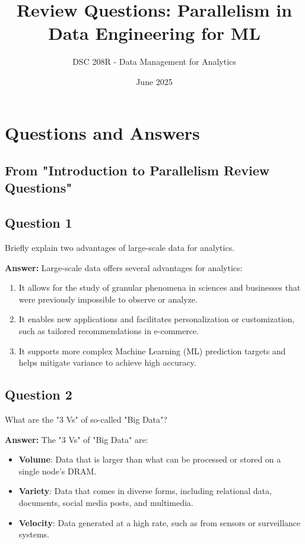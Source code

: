 \documentclass{article}
\title{Review Questions: Parallelism in Data Engineering for ML}
\author{DSC 208R - Data Management for Analytics}
\date{June 2025}
\begin{document}
\maketitle

\section*{Questions and Answers}

\subsection*{From "Introduction to Parallelism Review Questions"}

\subsection*{Question 1}
Briefly explain two advantages of large-scale data for analytics. 

\textbf{Answer:}
Large-scale data offers several advantages for analytics:
\begin{enumerate}
    \item It allows for the study of granular phenomena in sciences and businesses that were previously impossible to observe or analyze.
    \item It enables new applications and facilitates personalization or customization, such as tailored recommendations in e-commerce.
    \item It supports more complex Machine Learning (ML) prediction targets and helps mitigate variance to achieve high accuracy.
\end{enumerate}

\subsection*{Question 2}
What are the "3 Vs" of so-called "Big Data"? 

\textbf{Answer:}
The "3 Vs" of "Big Data" are:
\begin{itemize}
    \item \textbf{Volume}: Data that is larger than what can be processed or stored on a single node's DRAM.
    \item \textbf{Variety}: Data that comes in diverse forms, including relational data, documents, social media posts, and multimedia.
    \item \textbf{Velocity}: Data generated at a high rate, such as from sensors or surveillance systems.
\end{itemize}
\end{document}
